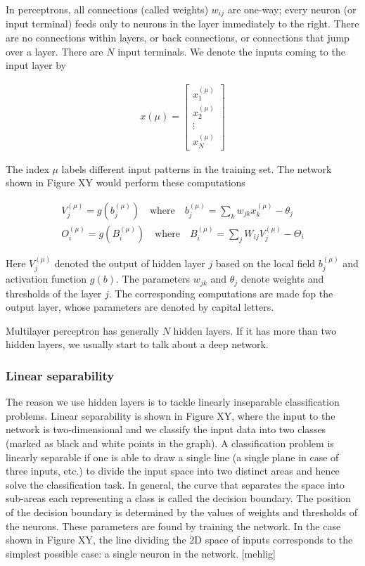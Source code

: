In perceptrons, all connections (called weights) $ w_{ij} $ are one-way; every neuron (or input terminal) feeds only to neurons in the layer immediately to the right. There are no connections within layers, or back connections, or connections that jump over a layer. There are $ N $ input terminals. We denote the inputs coming to the input layer by

\begin{gather}
	x(\mu)= 
	\begin{bmatrix}
	x_{1}^{(\mu)} \\
	x_{2}^{(\mu)} \\
	\vdots \\
	x_{N}^{(\mu)} 
	\end{bmatrix}
\end{gather}

The index $ \mu $ labels different input patterns in the training set. The network shown in Figure XY would perform these computations

\begin{gather}
V_j^{(\mu)} = g(b_j^{(\mu)}) \quad \text{where} \quad b_j^{(\mu)} = \sum_{k} w_{jk} x_{k}^{(\mu)} - \theta_{j} \\
O_i^{(\mu)} = g(B_i^{(\mu)}) \quad \text{where} \quad B_i^{(\mu)} = \sum_{j} W_{ij} V_{j}^{(\mu)} - \Theta_{i} 
\end{gather}

Here $ V_j^{(\mu)} $ denoted the output of hidden layer $ j $ based on the local field $ b_j^{(\mu)} $ and activation function $ g(b) $. The parameters $ w_{jk} $ and $ \theta_{j} $ denote weights and thresholds of the layer $ j $. The corresponding computations are made fop the output layer, whose parameters are denoted by capital letters. 

Multilayer perceptron has generally $ N $ hidden layers. If it has more than two hidden layers, we usually start to talk about a deep network. 

\subsubsection{Linear separability}

The reason we use hidden layers is to tackle linearly inseparable classification problems. Linear separability is shown in Figure XY, where the input to the network is two-dimensional and we classify the input data into two classes (marked as black and white points in the graph). A classification problem is linearly separable if one is able to draw a single line (a single plane in case of three inputs, etc.) to divide the input space into two distinct areas and hence solve the classification task. In general, the curve that separates the space into sub-areas each representing a class is called the decision boundary. The position of the decision boundary is determined by the values of weights and thresholds of the neurons. These parameters are found by training the network. In the case shown in Figure XY, the line dividing the 2D space of inputs corresponds to the simplest possible case: a single neuron in the network. [mehlig]

